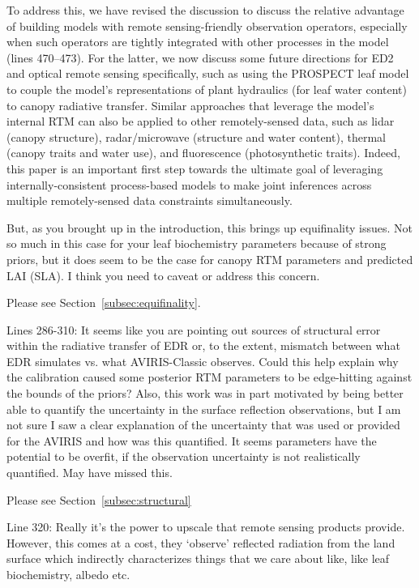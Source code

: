 To address this, we have revised the discussion to discuss the relative advantage of building models with remote sensing-friendly observation operators, especially when such operators are tightly integrated with other processes in the model (lines 470--473).
For the latter, we now discuss some future directions for ED2 and optical remote sensing specifically, such as using the PROSPECT leaf model to couple the model’s representations of plant hydraulics (for leaf water content) to canopy radiative transfer.
Similar approaches that leverage the model’s internal RTM can also be applied to other remotely-sensed data, such as lidar (canopy structure), radar/microwave (structure and water content), thermal (canopy traits and water use), and fluorescence (photosynthetic traits).
Indeed, this paper is an important first step towards the ultimate goal of leveraging internally-consistent process-based models to make joint inferences across multiple remotely-sensed data constraints simultaneously.

\begin{reviewer}
  But, as you brought up in the introduction, this brings up equifinality issues. Not so much in this case for your leaf biochemistry parameters because of strong priors, but it does seem to be the case for canopy RTM parameters and predicted LAI (SLA). I think you need to caveat or address this concern.
\end{reviewer}

Please see Section~\ref{subsec:equifinality}.

\begin{reviewer}
  Lines 286-310: It seems like you are pointing out sources of structural error within the radiative transfer of EDR or, to the extent, mismatch between what EDR simulates vs. what AVIRIS-Classic observes. Could this help explain why the calibration caused some posterior RTM parameters to be edge-hitting against the bounds of the priors? Also, this work was in part motivated by being better able to quantify the uncertainty in the surface reflection observations, but I am not sure I saw a clear explanation of the uncertainty that was used or provided for the AVIRIS and how was this quantified. It seems parameters have the potential to be overfit, if the observation uncertainty is not realistically quantified. May have missed this.
\end{reviewer}

Please see Section~\ref{subsec:structural}

\begin{reviewer}
  Line 320: Really it’s the power to upscale that remote sensing products provide. However, this comes at a cost, they ‘observe’ reflected radiation from the land surface which indirectly characterizes things that we care about like, like leaf biochemistry, albedo etc.
\end{reviewer}

